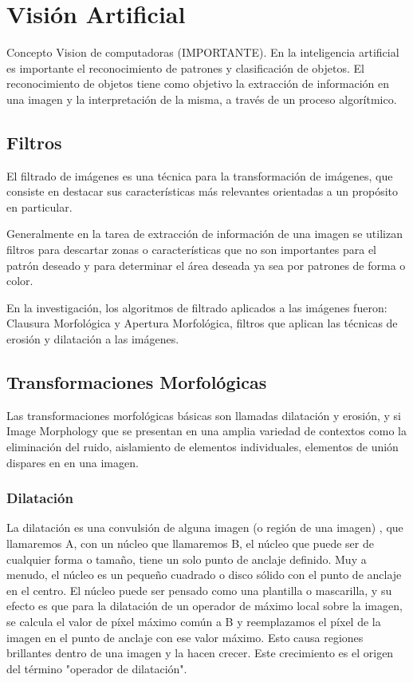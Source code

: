 \section{Visión Artificial} \label{sect:Vision_Artificial}

Concepto Vision de computadoras (IMPORTANTE). En la inteligencia artificial es importante el reconocimiento de patrones y clasificación de objetos. El reconocimiento de objetos tiene como
objetivo la extracción de información en una imagen y la interpretación de la misma, a través de un proceso algorítmico.

\subsection{Filtros }
El filtrado de imágenes es una técnica para la transformación de imágenes, que consiste en destacar  sus características más relevantes orientadas a un propósito en particular. 

Generalmente en la tarea de extracción de información de una imagen se utilizan filtros para descartar zonas o características que no son importantes para el patrón deseado y para determinar el área deseada ya sea por patrones de forma o color.

En la investigación, los algoritmos de filtrado aplicados a las imágenes fueron: Clausura Morfológica y Apertura Morfológica, filtros que aplican las técnicas de erosión y dilatación a las imágenes.

\subsection{Transformaciones Morfológicas}
Las transformaciones morfológicas básicas son llamadas dilatación y erosión, y si Image Morphology que se presentan en una amplia variedad de contextos como la eliminación del ruido, aislamiento de elementos individuales, elementos de unión dispares en en una imagen.\cite{BookOpenCv}

\subsubsection{Dilatación}
La dilatación es una convulsión de alguna imagen (o región de una imagen) , que llamaremos A, con un núcleo que llamaremos B, el núcleo que puede ser de cualquier forma o tamaño, tiene un solo punto de anclaje definido. Muy  a menudo, el núcleo es un pequeño cuadrado o disco sólido con el punto de anclaje en el centro. El núcleo puede ser pensado como una plantilla  o mascarilla, y su efecto es que para la dilatación de un operador de máximo local sobre la imagen, se calcula el valor de píxel máximo común a B y reemplazamos el píxel de la imagen en el punto de anclaje con ese valor máximo. Esto causa regiones brillantes dentro de una imagen y la hacen crecer. Este crecimiento es el origen del término "operador de dilatación". \cite{BookOpenCv}

